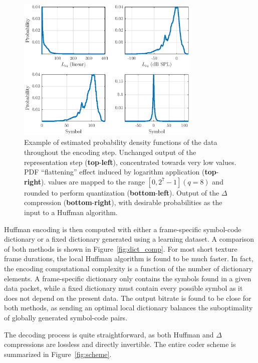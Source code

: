 \documentclass[sensors,article,accept,moreauthors,pdftex,10pt,a4paper]{mdpi}
\begin{document}
\begin{figure}[H]
	\centering
		\includegraphics[width=0.78\textwidth]{figures/pdf.eps}
	\caption{Example of estimated probability density functions of the data throughout the encoding step. Unchanged output of the representation step (\textbf{top}-\textbf{left}), concentrated towards very low values. PDF ``flattening'' effect induced by logarithm application (\textbf{top}-\textbf{right}).  values are mapped to the range $[0, 2^7-1] (q=8)$ and rounded to perform quantization (\textbf{bottom}-\textbf{left}). Output of the $\Delta$ compression  (\textbf{bottom}-\textbf{right}), with desirable probabilities as the input to a Huffman algorithm.}
	\label{fig:pdf}
\end{figure}

Huffman encoding is then computed with either a frame-specific symbol-code dictionary or a fixed dictionary generated using a learning dataset. A comparison of both methods is shown in Figure~\ref{fig:dict_comp}. For most short texture frame durations, the local Huffman algorithm is found to be much faster. In fact, the encoding computational complexity is a function of the number of dictionary elements. A frame-specific dictionary only contains the symbols found in a given data packet, while a fixed dictionary must contain every possible symbol as it does not depend on the present data. The output bitrate is found to be close for both methods, as sending an optimal local dictionary balances the suboptimality of globally generated symbol-code pairs.

The decoding process is quite straightforward, as both Huffman and $\Delta$ compressions are lossless and directly invertible. The entire coder scheme is summarized in Figure~\ref{fig:scheme}.
\vspace{-12pt} 
\end{document}
